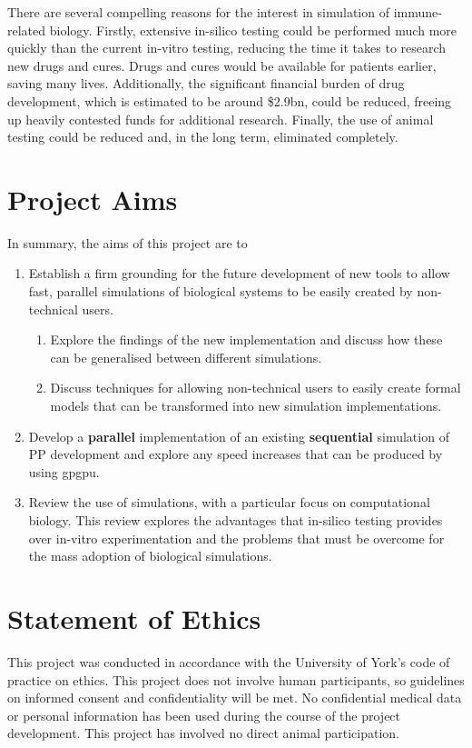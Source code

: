 \documentclass{UoYCSproject}
\begin{document}
There are several compelling reasons for the interest in simulation of immune-related biology.
Firstly, extensive \gls{in-silico} testing could be performed much more quickly than the current \gls{in-vitro} testing, reducing the time it takes to research new drugs and cures.
Drugs and cures would be available for patients earlier, saving many lives.
Additionally, the significant financial burden of drug development, which is estimated to be around \$2.9bn\cite{drug_cost}, could be reduced, freeing up heavily contested funds for additional research. Finally, the use of animal testing could be reduced and, in the long term, eliminated completely.

\section{Project Aims}
\label{aims}
In summary, the aims of this project are to
\begin{enumerate}
    \item Establish a firm grounding for the future development of new tools to allow fast, parallel simulations of biological systems to be easily created by non-technical users.
    \begin{enumerate}
        \item Explore the findings of the new implementation and discuss how these can be generalised between different simulations.
        \item Discuss techniques for allowing non-technical users to easily create formal models that can be transformed into new simulation implementations.
    \end{enumerate}
    \item Develop a \textbf{parallel} implementation of an existing \textbf{sequential} simulation of \gls{PP} development and explore any speed increases that can be produced by using \gls{gpgpu}.
    \item Review the use of simulations, with a particular focus on computational biology. This review explores the advantages that in-silico testing provides over \gls{in-vitro} experimentation and the problems that must be overcome for the mass adoption of biological simulations.
    
\end{enumerate}

\section{Statement of Ethics}
This project was conducted in accordance with the University of York's code of practice on ethics.
This project does not involve human participants, so guidelines on informed consent and confidentiality will be met. No confidential medical data or personal information has been used during the course of the project development. This project has involved no direct animal participation.
\end{document}
